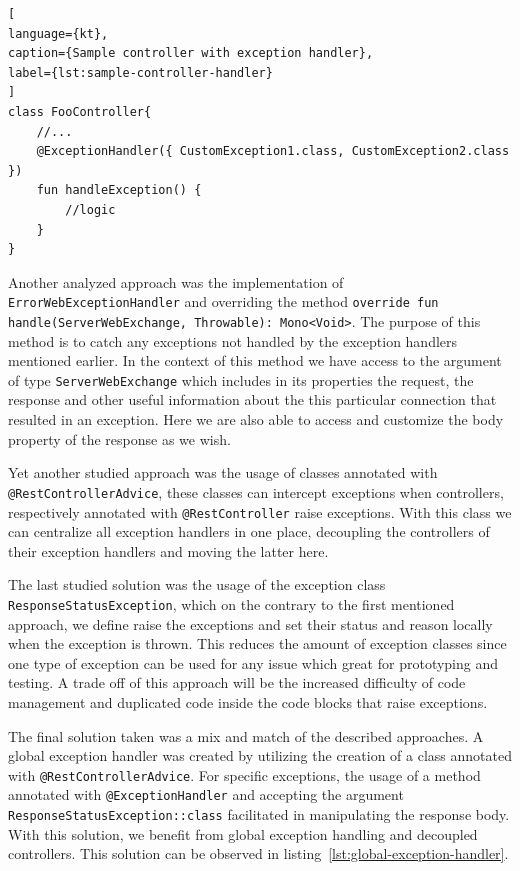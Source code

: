 \begin{lstlisting}[
language={kt},
caption={Sample controller with exception handler},
label={lst:sample-controller-handler}
]
class FooController{
    //...
    @ExceptionHandler({ CustomException1.class, CustomException2.class })
    fun handleException() {
        //logic
    }
}    
\end{lstlisting}

Another analyzed approach was the implementation of \lstinline{ErrorWebExceptionHandler} and overriding the method \lstinline{override fun handle(ServerWebExchange, Throwable): Mono<Void>}. The purpose of this method is to catch any exceptions not handled by the exception handlers mentioned earlier. In the context of this method we have access to the argument of type \lstinline{ServerWebExchange} which includes in its properties the request, the response and other useful information about the this particular connection that resulted in an exception. Here we are also able to access and customize the body property of the response as we wish.

Yet another studied approach was the usage of classes annotated with \lstinline{@RestControllerAdvice}, these classes can intercept exceptions when controllers, respectively annotated with \lstinline{@RestController} raise exceptions. With this class we can centralize all exception handlers in one place, decoupling the controllers of their exception handlers and moving the latter here. 

The last studied solution was the usage of the exception class  \lstinline{ResponseStatusException}, which on the contrary to the first mentioned approach, we define raise the exceptions and set their status and reason locally when the exception is thrown. This reduces the amount of exception classes since one type of exception can be used for any issue which great for prototyping and testing. A trade off of this approach will be the increased difficulty of code management and duplicated code inside the code blocks that raise exceptions. 

The final solution taken was a mix and match of the described approaches. A global exception handler was created by utilizing the creation of a class annotated with \lstinline{@RestControllerAdvice}. For specific exceptions, the usage of a method annotated with \lstinline{@ExceptionHandler} and accepting the argument \lstinline{ResponseStatusException::class} facilitated in manipulating the response body. With this solution, we benefit from global exception handling and decoupled controllers. This solution can be observed in listing~\ref{lst:global-exception-handler}.

